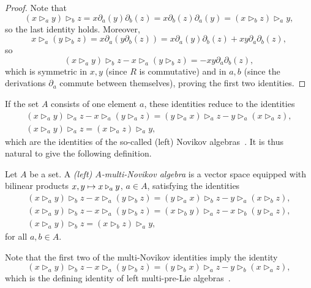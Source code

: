 \documentclass[AHL,Unicode,longabstracts]{cedram}
\let\oldmapsto\mapsto
\renewcommand*{\mapsto}{\mathchoice{\longmapsto}{\oldmapsto}{\oldmapsto}{\oldmapsto}}
\begin{document}
\begin{proof}
Note that
\[
(x \triangleright_a y) \triangleright_b z=x\partial_a(y)\partial_b(z)=x\partial_b(z)\partial_a(y)=(x \triangleright_b z)\triangleright_a y,
\]
so the last identity holds. Moreover,
\[
x \triangleright_a (y \triangleright_b z)=x\partial_a(y\partial_b(z))=x\partial_a(y)\partial_b(z)+xy\partial_a\partial_b(z),
\]
so
\[
(x \triangleright_a y) \triangleright_b z - x \triangleright_a (y \triangleright_b z)= -xy\partial_a\partial_b(z),
\]
which is symmetric in $x,y$ (since $R$ is commutative) and in $a,b$ (since the derivations $\partial_a$ commute between themselves), proving the first two identities.
\end{proof}

If the set $A$ consists of one element $a$, these identities reduce to the identities
\begin{gather*}
(x \triangleright_a y) \triangleright_a z - x \triangleright_a (y \triangleright_a z) = (y \triangleright_a x) \triangleright_a z - y \triangleright_a (x \triangleright_a z),
\\ (x \triangleright_a y) \triangleright_a z = (x \triangleright_a z)\triangleright_a y,
\end{gather*}
which are the identities of the so-called (left) Novikov algebras~\cite{BN85,DL,O92}. It is thus natural to give the following definition.

\begin{defi}\label{def_multi_novikov}
Let $A$ be a set. A \emph{(left) $A$-multi-Novikov algebra} is a vector space equipped with bilinear products $x,y\mapsto x\triangleright_a y$, $a\in A$, satisfying the identities
\begin{gather}
(x \triangleright_a y) \triangleright_b z - x \triangleright_a (y \triangleright_b z) = (y \triangleright_a x) \triangleright_b z - y \triangleright_a (x \triangleright_b z)\label{eq:exchgen}
,
\\ (x \triangleright_a y) \triangleright_b z - x \triangleright_a (y \triangleright_b z) = (x\triangleright_b y) \triangleright_a z - x \triangleright_b (y \triangleright_a z)\label{eq:exchA}
,
\\ (x \triangleright_a y) \triangleright_b z = (x \triangleright_b z)\triangleright_a y\label{eq:rcom}
,
\end{gather}
for all $ a,b\in A$.
\end{defi}

Note that the first two of the multi-Novikov identities imply the identity
\[
(x \triangleright_a y) \triangleright_b z - x \triangleright_a (y \triangleright_b z) = (y \triangleright_b x) \triangleright_a z - y \triangleright_b (x \triangleright_a z),
\]
which is the defining identity of left multi-pre-Lie algebras~\cite[Proposition~4.21]{BCCH}.
\end{document}
